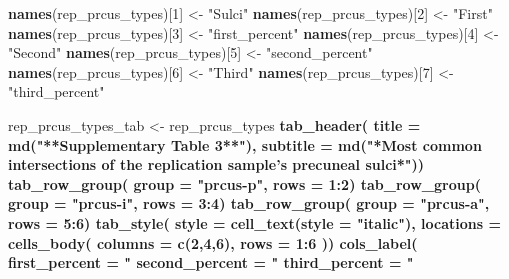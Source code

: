 \documentclass[
]{article}
\newenvironment{Shaded}{\begin{snugshade}}{\end{snugshade}}
\newcommand{\DataTypeTok}[1]{\textcolor[rgb]{0.13,0.29,0.53}{#1}}
\newcommand{\DecValTok}[1]{\textcolor[rgb]{0.00,0.00,0.81}{#1}}
\newcommand{\KeywordTok}[1]{\textcolor[rgb]{0.13,0.29,0.53}{\textbf{#1}}}
\newcommand{\NormalTok}[1]{#1}
\newcommand{\OperatorTok}[1]{\textcolor[rgb]{0.81,0.36,0.00}{\textbf{#1}}}
\newcommand{\StringTok}[1]{\textcolor[rgb]{0.31,0.60,0.02}{#1}}
\begin{document}
\begin{Shaded}
\begin{Highlighting}[]
\KeywordTok{names}\NormalTok{(rep_prcus_types)[}\DecValTok{1}\NormalTok{] <-}\StringTok{ "Sulci"}
\KeywordTok{names}\NormalTok{(rep_prcus_types)[}\DecValTok{2}\NormalTok{] <-}\StringTok{ "First"}
\KeywordTok{names}\NormalTok{(rep_prcus_types)[}\DecValTok{3}\NormalTok{] <-}\StringTok{ "first_percent"}
\KeywordTok{names}\NormalTok{(rep_prcus_types)[}\DecValTok{4}\NormalTok{] <-}\StringTok{ "Second"}
\KeywordTok{names}\NormalTok{(rep_prcus_types)[}\DecValTok{5}\NormalTok{] <-}\StringTok{ "second_percent"}
\KeywordTok{names}\NormalTok{(rep_prcus_types)[}\DecValTok{6}\NormalTok{] <-}\StringTok{ "Third"}
\KeywordTok{names}\NormalTok{(rep_prcus_types)[}\DecValTok{7}\NormalTok{] <-}\StringTok{ "third_percent"}

\NormalTok{rep_prcus_types_tab <-}\StringTok{ }\NormalTok{rep_prcus_types }\OperatorTok{%>%}\StringTok{ }\KeywordTok{gt}\NormalTok{() }\OperatorTok{%>%}
\KeywordTok{tab_header}\NormalTok{(}
  \DataTypeTok{title =} \KeywordTok{md}\NormalTok{(}\StringTok{"**Supplementary Table 3**"}\NormalTok{),}
  \DataTypeTok{subtitle =} \KeywordTok{md}\NormalTok{(}\StringTok{"*Most common intersections of the replication sample's precuneal sulci*"}\NormalTok{)) }\OperatorTok{%>%}
\KeywordTok{tab_row_group}\NormalTok{(}
    \DataTypeTok{group =} \StringTok{"prcus-p"}\NormalTok{,}
    \DataTypeTok{rows =} \DecValTok{1}\OperatorTok{:}\DecValTok{2}\NormalTok{) }\OperatorTok{%>%}
\KeywordTok{tab_row_group}\NormalTok{(}
    \DataTypeTok{group =} \StringTok{"prcus-i"}\NormalTok{,}
    \DataTypeTok{rows =} \DecValTok{3}\OperatorTok{:}\DecValTok{4}\NormalTok{) }\OperatorTok{%>%}
\KeywordTok{tab_row_group}\NormalTok{(}
    \DataTypeTok{group =} \StringTok{"prcus-a"}\NormalTok{,}
    \DataTypeTok{rows =} \DecValTok{5}\OperatorTok{:}\DecValTok{6}\NormalTok{) }\OperatorTok{%>%}
\KeywordTok{tab_style}\NormalTok{(}
    \DataTypeTok{style =} \KeywordTok{cell_text}\NormalTok{(}\DataTypeTok{style =} \StringTok{"italic"}\NormalTok{),}
    \DataTypeTok{locations =} \KeywordTok{cells_body}\NormalTok{(}
      \DataTypeTok{columns =} \KeywordTok{c}\NormalTok{(}\DecValTok{2}\NormalTok{,}\DecValTok{4}\NormalTok{,}\DecValTok{6}\NormalTok{),}
      \DataTypeTok{rows =} \DecValTok{1}\OperatorTok{:}\DecValTok{6}
\NormalTok{    )) }\OperatorTok{%>%}
\KeywordTok{cols_label}\NormalTok{(}
    \DataTypeTok{first_percent =} \StringTok{"%"}\NormalTok{,}
    \DataTypeTok{second_percent =} \StringTok{"%"}\NormalTok{,}
    \DataTypeTok{third_percent =} \StringTok{"%"}\NormalTok{) }\OperatorTok{%>%}
}}}}}}}}}
\end{Highlighting}
\end{Shaded}
\end{document}
